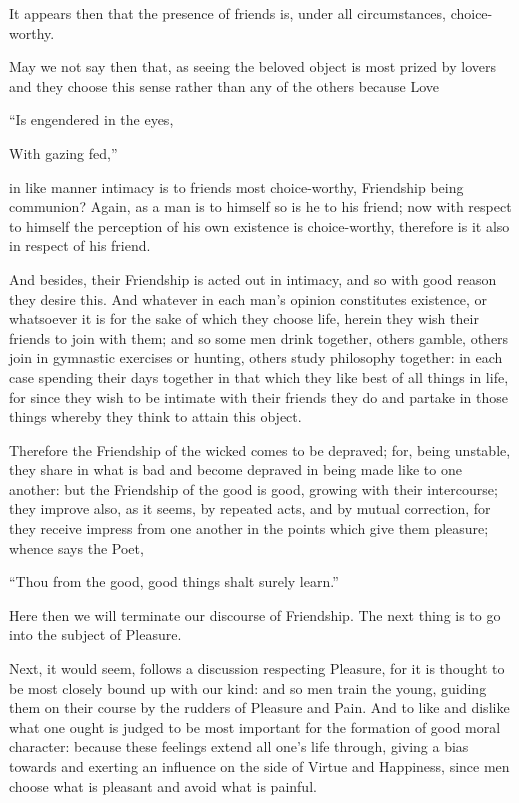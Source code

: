 It appears then that the presence of friends is, under all circumstances,
choice-worthy.


May we not say then that, as seeing the beloved object is most prized by lovers
and they choose this sense rather than any of the others because Love

“Is engendered in the eyes,

With gazing fed,”

in like manner intimacy is to friends most choice-worthy, Friendship being
communion? Again, as a man is to himself so is he to his friend; now with
respect to himself the perception of his own existence is choice-worthy,
therefore is it also in respect of his friend.

And besides, their Friendship is acted out in intimacy, and so with good reason
they desire this. And whatever in each man’s opinion constitutes
existence, or whatsoever it is for the sake of which they choose life, herein
they wish their friends to join with them; and so some men drink together,
others gamble, others join in gymnastic exercises or hunting, others study
philosophy together: in each case spending their days together in that which
they like best of all things in life, for since they wish to be intimate with
their friends they do and partake in those things whereby they think to attain
this object.

Therefore the Friendship of the wicked comes to be depraved; for, being
unstable, they share in what is bad and become depraved in being made like to
one another: but the Friendship of the good is good, growing with their
intercourse; they improve also, as it seems, by repeated acts, and by mutual
correction, for they receive impress from one another in the points which give
them pleasure; whence says the Poet,

“Thou from the good, good things shalt surely learn.”

Here then we will terminate our discourse of Friendship. The next thing is to
go into the subject of Pleasure.



Next, it would seem, follows a discussion respecting Pleasure, for it is
thought to be most closely bound up with our kind: and so men train the young,
guiding them on their course by the rudders of Pleasure and Pain. And to like
and dislike what one ought is judged to be most important for the formation of
good moral character: because these feelings extend all one’s life
through, giving a bias towards and exerting an influence on the side of Virtue
and Happiness, since men choose what is pleasant and avoid what is painful.


